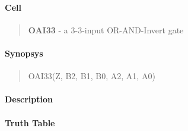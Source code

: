 \label{OAI33}
\paragraph{Cell}
\begin{quote}
    \textbf{OAI33} - a 3-3-input OR-AND-Invert gate
\end{quote}

\paragraph{Synopsys}
\begin{quote}
    OAI33(Z, B2, B1, B0, A2, A1, A0)
\end{quote}

\paragraph{Description}



\paragraph{Truth Table}


